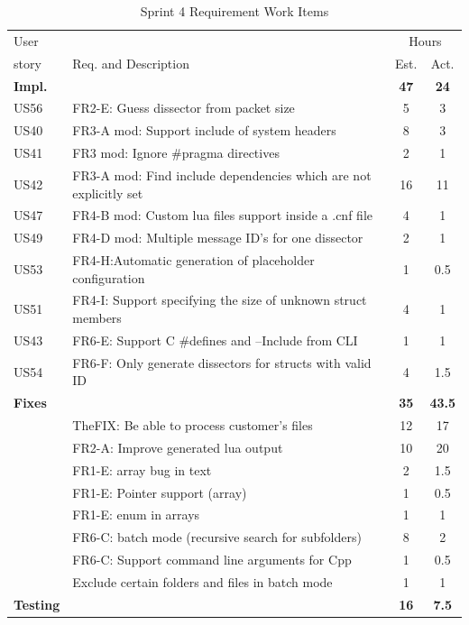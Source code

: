 \begin{table}[htbp] \small \center
\caption{Sprint 4 Requirement Work Items \label{tab:sprint4req}}
\begin{tabularx}{\textwidth}{l X c c}
	\toprule
	User & & \multicolumn{2}{c}{Hours} \\
	\cmidrule(r){3-4}
	story & Req. and Description & Est. & Act. \\
	\midrule
	\textbf{Impl.} &  & \textbf{47} & \textbf{24} \\
	US56 & FR2-E: Guess \gls{dissector} from \gls{packet} size & 5 & 3 \\
 	US40 & FR3-A mod: Support \gls{include} of system \glspl{header} &  8  & 3 \\
	US41 & FR3 mod: Ignore \#pragma directives & 2 & 1 \\
	US42 & FR3-A mod: Find include dependencies which are not explicitly set & 16  & 11 \\
	US47 & FR4-B mod: Custom \Gls{lua} files support inside a .cnf file & 4 & 1 \\
	US49 & FR4-D mod: Multiple message ID's for one \gls{dissector} & 2 & 1 \\
	US53 & FR4-H:Automatic generation of placeholder configuration & 1  & 0.5\\
	US51 & FR4-I: Support specifying the size of unknown struct members & 4 & 1 \\
	US43 & FR6-E: Support C \#defines and --Include from CLI & 1 & 1 \\
	US54 & FR6-F: Only generate dissectors for structs with valid ID & 4 & 1.5 \\
	\addlinespace
	\textbf{Fixes} &  & \textbf{35} & \textbf{43.5} \\
	& TheFIX: Be able to process customer's files & 12 & 17 \\
	 & FR2-A: Improve generated \Gls{lua} output & 10 & 20 \\
	 & FR1-E: \Gls{array} bug in text & 2 & 1.5 \\
	 & FR1-E: Pointer support (array) & 1 & 0.5 \\
	 & FR1-E: \Gls{enum} in \glspl{array} & 1 & 1 \\		
	 & FR6-C: \Gls{batch mode} (recursive search for subfolders) &  8  & 2 \\
	 & FR6-C: Support command line arguments for Cpp & 1 & 0.5\\
	 & Exclude certain folders and files in batch mode & 1 & 1 \\
	\addlinespace
	\textbf{Testing} &  & \textbf{16} & \textbf{7.5} \\

\end{tabularx}
\end{table}
